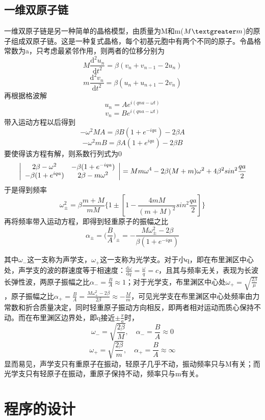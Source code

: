 \documentclass[UTF8]{article}
\begin{document}
\subsection{一维双原子链}
一维双原子链是另一种简单的晶格模型，由质量为M和m($M\textgreater m$)的原子组成双原子链。这是一种复式晶格，每个初基元胞中有两个不同的原子。令晶格常数为a，只考虑最紧邻作用，则两者的位移分别为$$M\frac{\mathrm{d}^2u_n}{\mathrm{d}t^2}=\beta(v_n+v_{n-1}-2u_n)$$ $${}m\frac{\mathrm{d}^2v_n}{\mathrm{d}t^2}=\beta(u_n+u_{n+1}-2v_n)$$
再根据格波解$$u_n=Ae^{i(qna-\omega t)}$$ $$v_n=Be^{i(qna-\omega t)}$$带入运动方程以后得到$$-\omega^2MA=\beta B(1+e^{-iqa})-2\beta A$$ $$-\omega^2mB=\beta A(1+e^{iqa})-2\beta B$$
要使得该方程有解，则系数行列式为0
$$\\
\left|\begin{array}{cccc} 
    2\beta-\omega^2    &    -\beta(1+e^{-iqa})     \\ 
    -\beta(1+e^{iqa})  &    2\beta-m\omega^2        \\ 
\end{array}\right| 
=Mm\omega ^4-2\beta(M+m)\omega^2+4\beta^2sin^2\frac{qa}{2}$$
于是得到频率$$\omega_\pm^2=\beta\frac{m+M}{mM}{\{1\pm[1-\frac{4mM}{(m+M)^2}sin^2\frac{qa}{2}]\}}$$
再将频率带入运动方程，即得到轻重原子的振幅之比$$\alpha_\pm={(\frac{B}{A}})_\pm=-\frac{M\omega_\pm^2-2\beta}{\beta(1+e^{-iqa})}$$
\par
其中$\omega_-$这一支称为声学支，$\omega_+$这一支称为光学支。对于小q，即在布里渊区中心处，声学支的波的群速度等于相速度：$\frac{\mathrm{d}\omega}{\mathrm{d}q}=\frac{\omega}{q}=c$，且其与频率无关，表现为长波长弹性波，两原子振幅之比$\alpha_-=\frac{B}{A}\approx1$；对于光学支，布里渊区中心处$\omega_+=\sqrt{\frac{2\beta}{\mu}}$，原子振幅之比$\alpha_+=\frac{B}{A}=\frac{M\omega_+^2-2\beta}{2\beta}\approx-\frac{M}{m}$，可见光学支在布里渊区中心处频率由力常数和折合质量决定，同时轻重原子振动方向相反，即两者相对运动而质心保持不动。而在布里渊区边界处，即q接近$\pm\frac{\pi}{a}$时，
$$\omega_-=\sqrt{\frac{2\beta}{M}},\quad\alpha_-=\frac{B}{A}\approx0$$
$$\omega_+=\sqrt{\frac{2\beta}{m}},\quad\alpha_+=\frac{B}{A}\approx\infty$$
显而易见，声学支只有重原子在振动，轻原子几乎不动，振动频率只与M有关；而光学支只有轻原子在振动，重原子保持不动，频率只与m有关。


\section{程序的设计}
\end{document}

